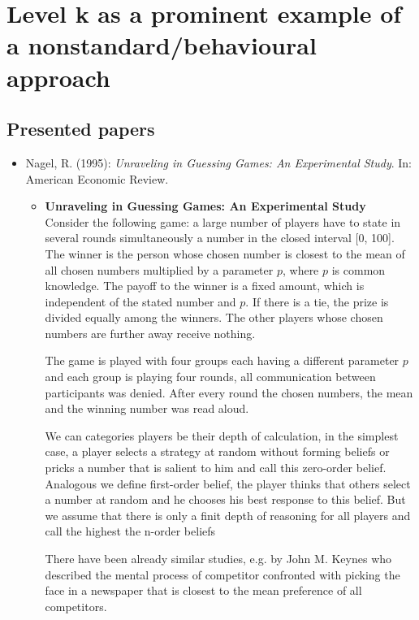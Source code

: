 
\chapter{Level k as a prominent example of a nonstandard/behavioural approach}


\section{Presented papers}

\begin{itemize}
	\item Nagel, R. (1995): \textit{Unraveling in Guessing Games: An Experimental Study}. In: American Economic Review.
		\begin{itemize}
			\item \textbf{Unraveling in Guessing Games: An Experimental Study} \\ 
			Consider the following game: a large number of players have to state in several rounds simultaneously a number in the closed interval [0, 100]. The winner is the person whose chosen number is closest to the mean of all chosen numbers multiplied by a parameter $p$, where $p$ is common knowledge. The payoff to the winner is a fixed amount, which is independent of the stated number and $p$. If there is a tie, the prize is divided equally among the winners. The other players whose chosen numbers are further away receive nothing.
			
			The game is played with four groups each having a different parameter $p$ and each group is playing four rounds, all communication between participants was denied. After every round the chosen numbers, the mean and the winning number was read aloud.
			
			We can categories players be their depth of calculation, in the simplest case, a player selects a strategy at random without forming beliefs or pricks a number that is salient to him and call this zero-order belief. Analogous we define first-order belief, the player thinks that others select a number at random and he chooses his best response to this belief. But we assume that there is only a finit depth of reasoning for all players and call the highest the n-order beliefs
			
			There have been already similar studies, e.g. by John M. Keynes who described the mental process of competitor confronted with picking the face in a newspaper that is closest to the mean preference of all competitors.
			

\end{itemize}
\end{itemize}
